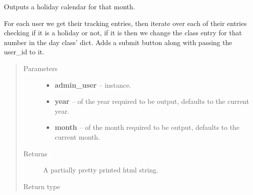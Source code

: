 \documentclass[letterpaper,10pt,english]{sphinxmanual}
\begin{document}

\begin{fulllineitems}
\label{timetracker:timetracker.utils.calendar_utils.gen_holiday_list}
Outputs a holiday calendar for that month.

For each user we get their tracking entries, then iterate over each of
their entries checking if it is a holiday or not, if it is then we change
the class entry for that number in the day class' dict. Adds a submit
button along with passing the user\_id to it.
\begin{quote}\begin{description}
\item[{Parameters}] \leavevmode\begin{itemize}
\item {} 
\textbf{admin\_user} -- {\hyperref[timetracker:timetracker.tracker.models.Tbluser]{}} instance.

\item {} 
\textbf{year} --  of the year required to be output, defaults to
the current year.

\item {} 
\textbf{month} --  of the month required to be output, defaults to
the current month.

\end{itemize}

\item[{Returns}] \leavevmode
A partially pretty printed html string.

\item[{Return type}] \leavevmode
{}

\end{description}\end{quote}

\end{fulllineitems}

\end{document}
